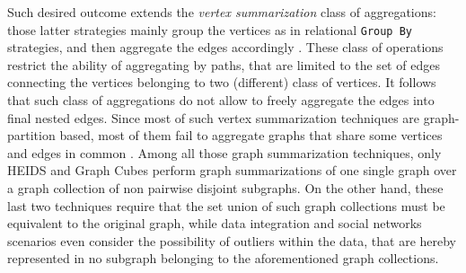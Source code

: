 Such desired outcome extends the \textit{vertex summarization} class of aggregations: those latter strategies mainly group the vertices as in relational \texttt{Group By} strategies, and then aggregate the edges accordingly \cite{JunghannsPR17}. These class of operations restrict the ability of aggregating by paths, that are limited to the set of edges connecting the vertices belonging to two (different) class of vertices. It follows that such class of aggregations   do not allow to freely aggregate the edges into final nested edges. Since most of such vertex summarization techniques are graph-partition based, most of them fail to aggregate graphs that share some vertices and edges in common \cite{yin,Tian20085,jakawat}. Among all those graph summarization techniques, only HEIDS \cite{ChengJQ16} and Graph Cubes \cite{Zhao11} perform graph summarizations of one single graph over a graph collection of non pairwise disjoint subgraphs. On the other hand, these last two techniques require that the set union of such graph collections must be equivalent to the original graph, while data integration and social networks scenarios even consider the possibility of outliers within the data, that are hereby represented in no subgraph belonging to the aforementioned graph collections. %




